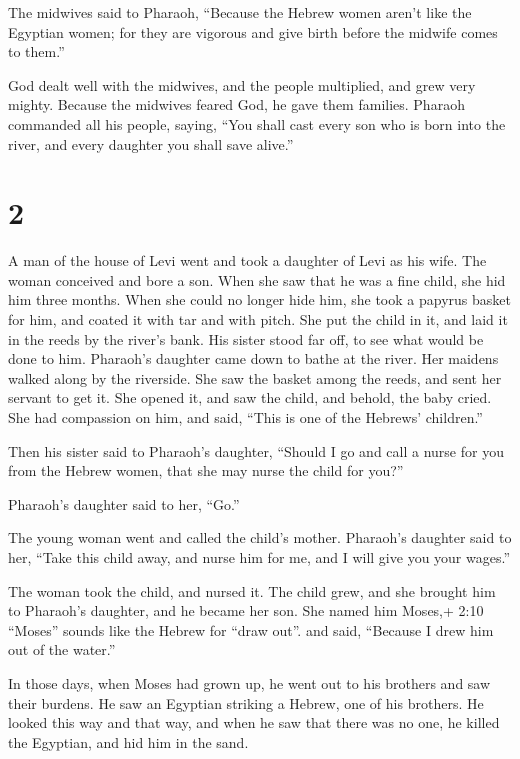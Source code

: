  The midwives said to Pharaoh, ``Because the Hebrew women
aren't like the Egyptian women; for they are vigorous and give birth
before the midwife comes to them.''

 God dealt well with the midwives, and the people
multiplied, and grew very mighty.  Because the midwives
feared God, he gave them families.  Pharaoh commanded all
his people, saying, ``You shall cast every son who is born into the
river, and every daughter you shall save alive.''

\hypertarget{section-1}{%
\section{2}\label{section-1}}

 A man of the house of Levi went and took a daughter of Levi
as his wife.  The woman conceived and bore a son. When she
saw that he was a fine child, she hid him three months. 
When she could no longer hide him, she took a papyrus basket for him,
and coated it with tar and with pitch. She put the child in it, and laid
it in the reeds by the river's bank.  His sister stood far
off, to see what would be done to him.  Pharaoh's daughter
came down to bathe at the river. Her maidens walked along by the
riverside. She saw the basket among the reeds, and sent her servant to
get it.  She opened it, and saw the child, and behold, the
baby cried. She had compassion on him, and said, ``This is one of the
Hebrews' children.''

 Then his sister said to Pharaoh's daughter, ``Should I go
and call a nurse for you from the Hebrew women, that she may nurse the
child for you?''

 Pharaoh's daughter said to her, ``Go.''

The young woman went and called the child's mother. 
Pharaoh's daughter said to her, ``Take this child away, and nurse him
for me, and I will give you your wages.''

The woman took the child, and nursed it.  The child grew,
and she brought him to Pharaoh's daughter, and he became her son. She
named him Moses,+ 2:10 ``Moses'' sounds like the Hebrew for ``draw
out''. and said, ``Because I drew him out of the water.''

 In those days, when Moses had grown up, he went out to his
brothers and saw their burdens. He saw an Egyptian striking a Hebrew,
one of his brothers.  He looked this way and that way, and
when he saw that there was no one, he killed the Egyptian, and hid him
in the sand.

